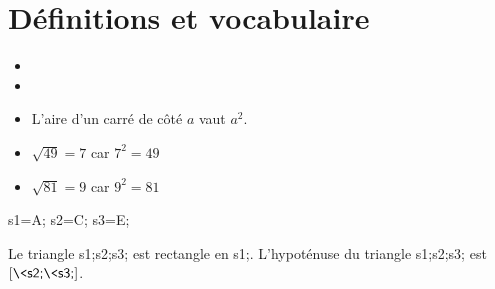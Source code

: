 \documentclass[../main.tex]{subfiles}
\begin{document}
    \part{Définitions et vocabulaire}

    \begin{exemple}
        \begin{itemize}
            \item{}
            \item{}
            \item L'aire d'un carré de côté $a$ vaut $a^2$.
        \end{itemize}
    \end{exemple}

    \begin{exemple}
        \begin{itemize}
            \item$\sqrt{49}=7$ car $7^2=49$
            \item$\sqrt{81}=9$ car $9^2=81$
        \end{itemize}
    \end{exemple}

    \begin{exemple}\par\noindent
        \>s1=A;%
        \>s2=C;%
        \>s3=E;%
        \begin{minipage}{.35\linewidth}
        \end{minipage}\hspace{.05\linewidth}
        \begin{minipage}{.55\linewidth}
            Le triangle \textsf{\<s1;\<s2;\<s3;} est rectangle en
            \textsf{\<s1;}. L'hypoténuse du triangle \textsf{\<s1;\<s2;\<s3;}
            est $[\textsf{\<s2;\<s3;}]$.                
        \end{minipage}
    \end{exemple}
\end{document}
